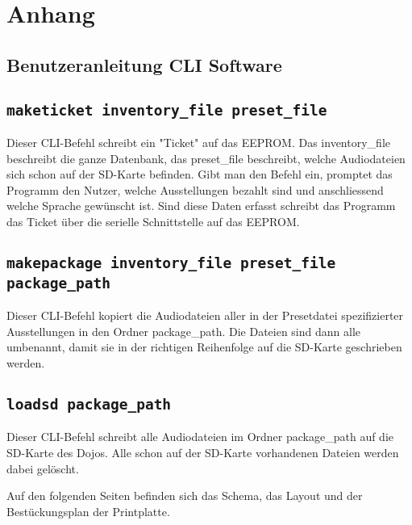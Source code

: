 \chapter{Anhang}
\label{Anhang}
\thispagestyle{fancy}  


\section{Benutzeranleitung CLI Software}
\section*{\texttt{maketicket inventory\_file preset\_file}}
Dieser CLI-Befehl schreibt ein "Ticket" auf das EEPROM.
Das inventory\_file beschreibt die ganze Datenbank, 
das preset\_file beschreibt, welche Audiodateien sich schon auf der SD-Karte befinden.
Gibt man den Befehl ein, promptet das Programm den Nutzer, 
welche Ausstellungen bezahlt sind und anschliessend welche Sprache gewünscht ist.
Sind diese Daten erfasst schreibt das Programm das Ticket über die serielle Schnittstelle auf das EEPROM.
\section*{\texttt{makepackage inventory\_file preset\_file package\_path}}
Dieser CLI-Befehl kopiert die Audiodateien aller in der Presetdatei spezifizierter Ausstellungen in den Ordner package\_path. 
Die Dateien sind dann alle umbenannt, damit sie in der richtigen Reihenfolge auf die SD-Karte geschrieben werden.
\section*{\texttt{loadsd package\_path}}
Dieser CLI-Befehl schreibt alle Audiodateien im Ordner package\_path auf die SD-Karte des Dojos. Alle schon auf der SD-Karte vorhandenen Dateien werden dabei gelöscht.

\newpage
Auf den folgenden Seiten befinden sich das Schema, das Layout und der Bestückungsplan der Printplatte.


\label{pdf:SchemaSpannungsversorgung}


\label{pdf:SchemaUSB}


\label{pdf:SchemaMikrocontroller}


\label{pdf:BestueckungTop}


\label{pdf:BestueckungBottom}


\label{pdf:LayoutAll}


\label{pdf:LayoutTop}


\label{pdf:LayoutBottom}
